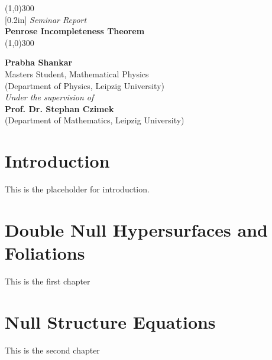 \documentclass[12pt, a4paper]{report}
\theoremstyle{bfnote}
\begin{document}
\begin{titlepage}
    \begin{center}
    \line(1,0){300}\\
    [0.2in]
    \normalsize{\emph {Seminar Report}}\\	
    \Huge{\bfseries Penrose Incompleteness Theorem}\\
    [-0.12in]
    \line(1,0){300}\\
    
    \vspace{3in}
    
    \LARGE{\bfseries {Prabha Shankar}}\\
    \small{Masters Student, Mathematical Physics}\\
    \small{(Department of Physics, Leipzig University)}\\
    
    \vspace{3cm}
    \normalsize{\emph {Under the supervision of}}\\
    \large{\bfseries {Prof. Dr. Stephan Czimek}}\\
    \small{(Department of Mathematics, Leipzig University)}\\
    
    \end{center}
\end{titlepage}

\section*{Introduction}
This is the placeholder for introduction. 

\section{Double Null Hypersurfaces and Foliations}
This is the first chapter

\section{Null Structure Equations}
This is the second chapter
\end{document}

